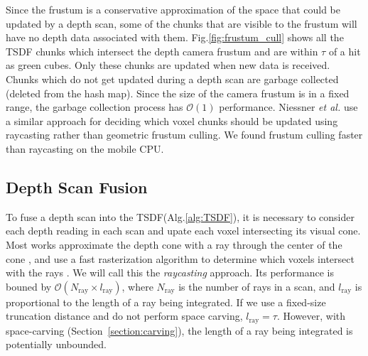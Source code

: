 \documentclass[conference]{IEEEtran}
\newcommand{\sref}[1]{Section~\ref{#1}}
\newcommand{\figref}[1]{Fig.\ref{#1}}
\newcommand{\algoref}[1]{Alg.\ref{#1}}
\newcommand{\etal}{\textit{et al.}\xspace}
\newcommand{\TSDF}{TSDF\xspace}
\begin{document}
Since the frustum is a conservative approximation of the space that could be
updated by a depth scan, some of the chunks that are visible to the frustum will
have no depth data associated with them. \figref{fig:frustum_cull} shows all the
\TSDF chunks which intersect the depth camera frustum and are within $\tau$ of
a hit as green cubes. Only these chunks are updated when new data is received. 
Chunks which do not get updated during a depth scan are garbage collected
(deleted from the hash map). Since the size of the camera frustum is in a fixed
range, the garbage collection process has $\mathcal{O}(1)$ performance. Niessner
\etal \cite{NiessnerHashing} use a similar approach for deciding which voxel
chunks should be updated using raycasting rather than geometric frustum
culling. We found frustum culling faster than raycasting on the mobile CPU.

\subsection{Depth Scan Fusion}
\label{section:scan_integration}
To fuse a depth scan into the \TSDF (\algoref{alg:TSDF}), it is necessary
to consider each depth reading in each scan and upate each
voxel intersecting its visual cone. Most works  approximate the depth cone with
a ray through the center of the cone \cite{Newcombe, NiessnerHashing}, and use
a fast rasterization algorithm to determine which voxels intersect with the
rays \cite{RayTracing}. We will call this the \textit{raycasting} approach.
Its performance is bouned by $\mathcal{O}(N_{\text{ray}} \times l_{\text{ray}})$, 
where $N_{\text{ray}}$ is the number of rays in a scan, and $l_{\text{ray}}$ 
is proportional to the length of a ray being integrated. If we use a fixed-size
truncation distance and do not perform space carving, $l_{\text{ray}} = \tau$.
However, with space-carving (\sref{section:carving}), the length of a ray being
integrated is potentially unbounded. 
\end{document}
